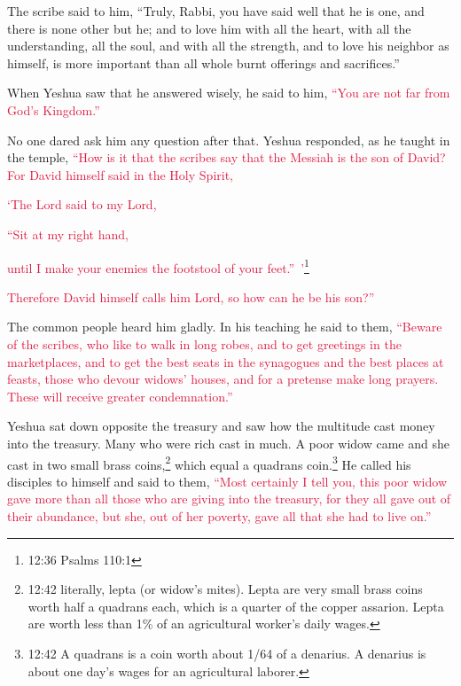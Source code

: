 \myverse{}The scribe said to him, “Truly, Rabbi, you have said well that
he is one, and there is none other but he;
\myverse{}and to love him with all the heart, with all the understanding, all the soul,
and with all the strength, and to love his neighbor as himself, is more important than all whole burnt
offerings and sacrifices.”

\myverse{}When Yeshua saw that he answered wisely, he said to him,
\textcolor{crimson}{“You are not far from God’s Kingdom.”}

No one dared ask him any question after that.
\myverse{}Yeshua responded, as he taught in the temple,
\textcolor{crimson}{“How is it that the scribes say that the Messiah is the son of David?
}
\myverse{}\textcolor{crimson}{For David himself said in the Holy Spirit,}

\textcolor{crimson}{‘The Lord said to my Lord,}

\textcolor{crimson}{“Sit at my right hand,}

\textcolor{crimson}{until I make your enemies the footstool of your feet.” ’}\footnote{12:36 Psalms 110:1}

\myverse{}\textcolor{crimson}{Therefore David himself calls him Lord, so how can he be
	his son?”
}

The common people heard him gladly.
\myverse{}In his teaching he said to them,
\textcolor{crimson}{“Beware of the scribes, who like to walk in long robes, and to get greetings in the marketplaces,
}
\myverse{}\textcolor{crimson}{and to get the best seats in the synagogues and the best places at feasts,
}
\myverse{}\textcolor{crimson}{those who devour widows’ houses, and for a pretense make long prayers.
	These will receive greater condemnation.”}

\myverse{}Yeshua sat down opposite the treasury and saw how the multitude
cast money into the treasury. Many who were rich cast in much.
\myverse{}A poor widow came and she cast in two small brass coins,\footnote{12:42 literally, lepta (or widow’s mites). Lepta are very small brass coins worth half a quadrans each,
	which is a quarter of the copper assarion. Lepta are worth less than 1\% of an agricultural worker’s daily
	wages.} which equal a quadrans coin.\footnote{12:42 A quadrans is a coin worth about 1/64 of a denarius. A denarius is about one day’s wages for
	an agricultural laborer.}
\myverse{}He called his disciples to himself and said to them,
\textcolor{crimson}{“Most certainly I tell you, this poor widow gave more than all those who are giving into the treasury,
}
\myverse{}\textcolor{crimson}{for they all gave out of their abundance, but she, out of her poverty,
	gave all that she had to live on.”}


